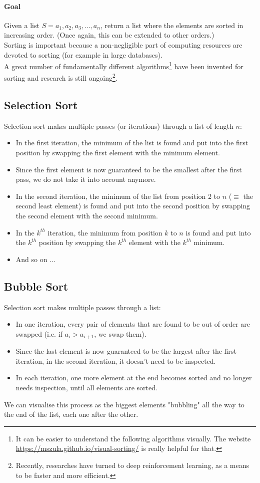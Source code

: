 \documentclass[10pt,a4paper]{book}
\begin{document}
\paragraph*{Goal}
Given a list $S = a_{1},a_{2},a_{3},...,a_{n}$, return a list where the elements are sorted in increasing order. (Once again, this can be extended to other orders.)\\
Sorting is important because a non-negligible part of computing resources are devoted to sorting (for example in large databases). \\
A great number of fundamentally different algorithms\footnote{It can be easier to understand the following algorithms visually. The website \url{https://mszula.github.io/visual-sorting/} is really helpful for that.} have been invented for sorting and research is still ongoing\footnote{Recently, researches have turned to deep reinforcement learning, as a means to be faster and more efficient.}.

\subsection{Selection Sort}
Selection sort makes multiple passes (or iterations) through a list of length $n$:
\begin{itemize}
\item In the first iteration, the minimum of the list is found and put into the first position by swapping the first element with the minimum element.
\item Since the first element is now guaranteed to be the smallest after the first pass, we do not take it into account anymore.
\item In the second iteration, the minimum of the list from position 2 to $n$ ($\equiv$ the second least element) is found and put into the second position by swapping the second element with the second minimum.
\item In the $k^{th}$ iteration, the minimum from position $k$ to $n$ is found and put into the $k^{th}$ position by swapping the $k^{th}$ element with the $k^{th}$ minimum.
\item And so on ...
\end{itemize}

\subsection{Bubble Sort}
Selection sort makes multiple passes through a list:
\begin{itemize}
\item In one iteration, every pair of elements that are found to be out of order are swapped (i.e. if $a_i > a_{i+1}$, we swap them).
\item Since the last element is now guaranteed to be the largest after the first iteration, in the second iteration, it doesn't need to be inspected.
\item In each iteration, one more element at the end becomes sorted and no longer needs inspection, until all elements are sorted.
\end{itemize}
We can visualise this process as the biggest elements "bubbling" all the way to the end of the list, each one after the other.
\end{document}
